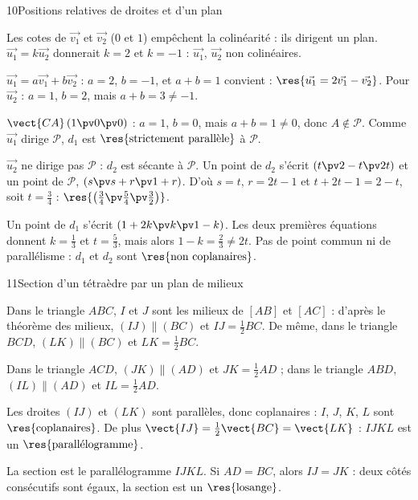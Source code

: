 \begin{deuxcolonnes}
\begin{corrige}{10}{Positions relatives de droites et d'un plan}
\begin{questions}
  \item Les cotes de $\vec{v_1}$ et $\vec{v_2}$ ($0$ et $1$) empêchent la colinéarité : ils dirigent un plan. $\vec{u_1}=k\vec{u_2}$
    donnerait $k=2$ et $k=-1$ : $\vec{u_1}$, $\vec{u_2}$ non colinéaires.
  \item $\vec{u_1}=a\vec{v_1}+b\vec{v_2}$ : $a=2$, $b=-1$, et $a+b=1$ convient : $\res{\vec{u_1}=2\vec{v_1}-\vec{v_2}}$.
    Pour $\vec{u_2}$ : $a=1$, $b=2$, mais $a+b=3\neq-1$.
  \item $\vect{CA}\,(1\pv0\pv0)$ : $a=1$, $b=0$, mais $a+b=1\neq0$, donc $A\notin\mathcal{P}$. Comme $\vec{u_1}$ dirige
    $\mathcal{P}$, $d_1$ est $\res{\text{strictement parallèle}}$ à $\mathcal{P}$.
  \item $\vec{u_2}$ ne dirige pas $\mathcal{P}$ : $d_2$ est sécante à $\mathcal{P}$. Un point de $d_2$ s'écrit $(t\pv2-t\pv2t)$ et un
    point de $\mathcal{P}$, $(s\pv s+r\pv1+r)$. D'où $s=t$, $r=2t-1$ et $t+2t-1=2-t$, soit $t=\frac34$ :
    $\res{\left(\tfrac34\pv\tfrac54\pv\tfrac32\right)}$.
  \item Un point de $d_1$ s'écrit $(1+2k\pv k\pv1-k)$. Les deux premières équations donnent $k=\frac13$ et $t=\frac53$, mais
    alors $1-k=\frac23\neq2t$. Pas de point commun ni de parallélisme : $d_1$ et $d_2$ sont $\res{\text{non coplanaires}}$.
\end{questions}
\end{corrige}

\begin{corrige}{11}{Section d'un tétraèdre par un plan de milieux}
\begin{questions}
  \item Dans le triangle $ABC$, $I$ et $J$ sont les milieux de $[AB]$ et $[AC]$ : d'après le théorème des milieux, $(IJ)\parallel(BC)$
    et $IJ=\frac12BC$. De même, dans le triangle $BCD$, $(LK)\parallel(BC)$ et $LK=\frac12BC$.
  \item Dans le triangle $ACD$, $(JK)\parallel(AD)$ et $JK=\frac12AD$ ; dans le triangle $ABD$, $(IL)\parallel(AD)$ et
    $IL=\frac12AD$.
  \item Les droites $(IJ)$ et $(LK)$ sont parallèles, donc coplanaires : $I$, $J$, $K$, $L$ sont $\res{\text{coplanaires}}$. De plus
    $\vect{IJ}=\frac12\vect{BC}=\vect{LK}$ : $IJKL$ est un $\res{\text{parallélogramme}}$.
  \item La section est le parallélogramme $IJKL$. Si $AD=BC$, alors $IJ=JK$ : deux côtés consécutifs sont égaux, la section est un
    $\res{\text{losange}}$.
\end{questions}
\end{corrige}


\end{deuxcolonnes}
